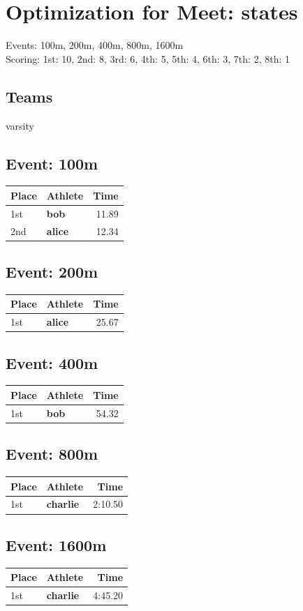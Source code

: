 \documentclass[11pt]{article}
\begin{document}
\section*{Optimization for Meet: states}

Events: 100m, 200m, 400m, 800m, 1600m\\

Scoring: 1st: 10, 2nd: 8, 3rd: 6, 4th: 5, 5th: 4, 6th: 3, 7th: 2, 8th: 1\\

\subsection*{Teams}
varsity

\subsection*{Event: 100m}
\begin{tabularx}{\linewidth}{lXr}
\toprule
Place & Athlete & Time \\
\midrule
1st & \textbf{bob} & 11.89 \\
2nd & \textbf{alice} & 12.34 \\
\bottomrule
\end{tabularx}

\subsection*{Event: 200m}
\begin{tabularx}{\linewidth}{lXr}
\toprule
Place & Athlete & Time \\
\midrule
1st & \textbf{alice} & 25.67 \\
\bottomrule
\end{tabularx}

\subsection*{Event: 400m}
\begin{tabularx}{\linewidth}{lXr}
\toprule
Place & Athlete & Time \\
\midrule
1st & \textbf{bob} & 54.32 \\
\bottomrule
\end{tabularx}

\subsection*{Event: 800m}
\begin{tabularx}{\linewidth}{lXr}
\toprule
Place & Athlete & Time \\
\midrule
1st & \textbf{charlie} & 2:10.50 \\
\bottomrule
\end{tabularx}

\subsection*{Event: 1600m}
\begin{tabularx}{\linewidth}{lXr}
\toprule
Place & Athlete & Time \\
\midrule
1st & \textbf{charlie} & 4:45.20 \\
\bottomrule
\end{tabularx}
\end{document}
